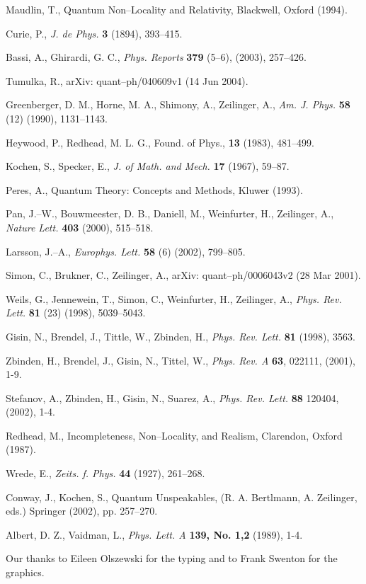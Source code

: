 \documentclass[12pt]{amsart}
\begin{document}
\begin{thebibliography}{99999999}

Maudlin, T., Quantum Non--Locality and Relativity,
Blackwell, Oxford (1994).

Curie, P.,  {\it J. de Phys.} {\bf 3} (1894), 393--415.

Bassi, A., Ghirardi, G. C., {\it Phys. Reports} {\bf 379} (5--6), (2003),
257--426.

Tumulka, R., arXiv: quant--ph/040609v1 (14 Jun 2004).

Greenberger, D. M., Horne, M. A., Shimony, A., Zeilinger, A.,
{\it Am. J. Phys.} {\bf 58} (12) (1990), 1131--1143.

Heywood, P., Redhead, M. L. G., {Found. of Phys.},
{\bf 13} (1983), 481--499.

Kochen, S., Specker, E., {\it J. of Math. and Mech.}
{\bf 17} (1967), 59--87.

Peres, A., Quantum Theory: Concepts and Methods, Kluwer (1993).

Pan, J.--W., Bouwmeester, D. B., Daniell, M., Weinfurter, H.,
Zeilinger, A., {\it Nature Lett.} {\bf 403} (2000), 515--518.

Larsson, J.--A., {\it Europhys. Lett.} {\bf 58} (6) (2002), 799--805.

Simon, C., Brukner, C., Zeilinger, A., arXiv: quant--ph/0006043v2
(28 Mar 2001).

Weils, G., Jennewein, T., Simon, C., Weinfurter, H.,
Zeilinger, A., {\it Phys. Rev. Lett.} {\bf 81} (23) (1998),
5039--5043.

Gisin, N., Brendel, J., Tittle, W., Zbinden, H.,
{\it Phys. Rev. Lett.} {\bf 81} (1998), 3563.

Zbinden, H., Brendel, J., Gisin, N., Tittel, W.,
{\it Phys. Rev. A} {\bf 63}, 022111,  (2001), 1-9.

Stefanov, A., Zbinden, H., Gisin, N., Suarez, A.,
{\it Phys. Rev. Lett.} {\bf 88} 120404,  (2002), 1-4.

Redhead, M.,  Incompleteness, Non--Locality, and Realism,
Clarendon, Oxford (1987).

Wrede, E., {\it Zeits. f. Phys.} {\bf 44} (1927), 261--268.

Conway, J., Kochen, S.,
Quantum Unspeakables, (R. A. Bertlmann, A. Zeilinger, eds.)
Springer (2002), pp. 257--270.

Albert, D. Z., Vaidman, L.,
{\it Phys. Lett. A} {\bf 139, No. 1,2} (1989), 1-4.



\end{thebibliography}

Our thanks to Eileen Olszewski for the typing and to Frank Swenton
for the graphics.
\end{document}
